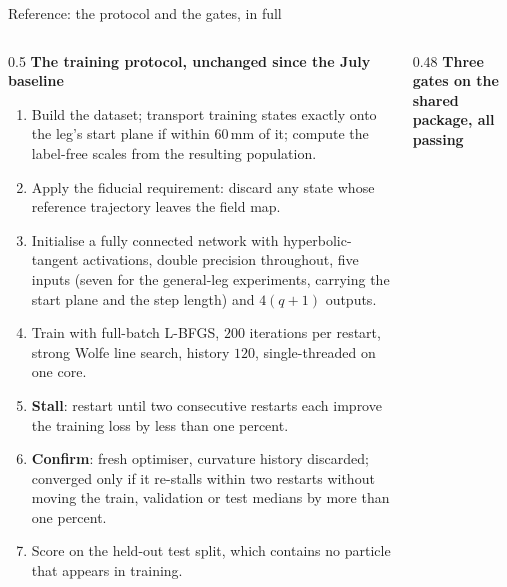 \documentclass[aspectratio=169,10pt]{beamer}
\newcommand{\mm}{\ensuremath{\,\mathrm{mm}}}
\begin{document}

\begin{frame}[shrink=25]{Reference: the protocol and the gates, in full}
  \vspace{1mm}
  \begin{columns}[T]
    \begin{column}{0.5\textwidth}
      \textbf{The training protocol, unchanged since the July baseline}
      \begin{enumerate}\scriptsize
        \item Build the dataset; transport training states exactly onto the
              leg's start plane if within $60\mm$ of it; compute the label-free
              scales from the resulting population.
        \item Apply the fiducial requirement: discard any state whose reference
              trajectory leaves the field map.
        \item Initialise a fully connected network with hyperbolic-tangent
              activations, double precision throughout, five inputs (seven for
              the general-leg experiments, carrying the start plane and the step
              length) and $4(q+1)$ outputs.
        \item Train with full-batch L-BFGS, $200$ iterations per restart, strong
              Wolfe line search, history $120$, single-threaded on one core.
        \item \textbf{Stall}: restart until two consecutive restarts each
              improve the training loss by less than one percent.
        \item \textbf{Confirm}: fresh optimiser, curvature history discarded;
              converged only if it re-stalls within two restarts without moving
              the train, validation or test medians by more than one percent.
        \item Score on the held-out test split, which contains no particle that
              appears in training.
      \end{enumerate}
    \end{column}
    \begin{column}{0.48\textwidth}
      \textbf{Three gates on the shared package, all passing}
      \begin{itemize}\scriptsize

\end{itemize}
\end{column}
\end{columns}
\end{frame}
\end{document}
